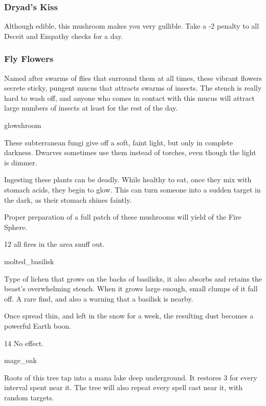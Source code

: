 \begin{multicols}{2}
\subsubsection{Dryad's Kiss}
\label{dryads_kiss}

Although edible, this mushroom makes you very gullible.
Take a -2 penalty to all Deceit and Empathy checks for a day.

\subsubsection{Fly Flowers}
\label{fly_flowers}

Named after swarms of flies that surround them at all times, these vibrant flowers secrete sticky, pungent mucus that attracts swarms of insects.
The stench is really hard to wash off, and anyone who comes in contact with this mucus will attract large numbers of insects at least for the rest of the day.

%
  {glowshroom}%
  {
   These subterranean fungi give off a soft, faint light, but only in complete darkness.
   Dwarves sometimes use them instead of torches, even though the light is dimmer.

   Ingesting these plants can be deadly.
   While healthy to eat, once they mix with stomach acids, they begin to glow.
   This can turn someone into a sudden target in the dark, as their stomach shines faintly.

   Proper preparation of a full patch of these mushrooms will yield  of the Fire Sphere.
    }
  {}%
  {12}%
  {all fires in the \gls{area} snuff out.}%

%
  {molted_basilisk}%
  {
  Type of lichen that grows on the backs of basilisks, it also absorbs and retains the beast's overwhelming stench.
  When it grows large enough, small clumps of it fall off.
  A rare find, and also a warning that a basilisk is nearby.

  Once spread thin, and left in the snow for a week, the resulting dust becomes a powerful Earth \gls{boon}.
    }
{}%
{14}%
{No effect.}%

%
  {mage_oak}%
  {
    Roots of this tree tap into a mana lake deep underground.
    It restores 3  for every \gls{interval} spent near it.
    The tree will also repeat every spell cast near it, with random targets.

}
\end{multicols}
